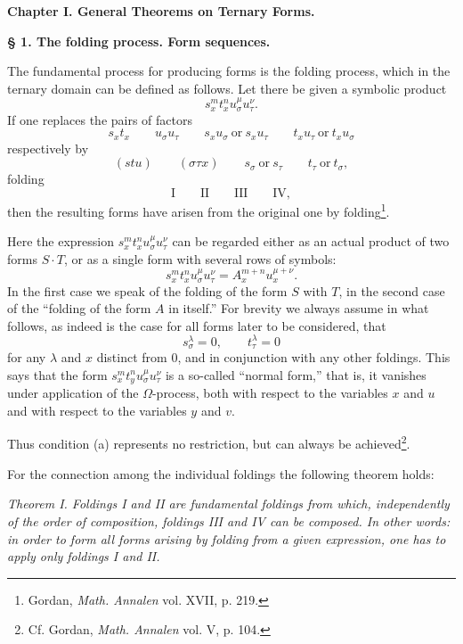 \documentclass[11pt]{article}
\begin{document}
\begin{center}
{\Large\bfseries Chapter I. \quad General Theorems on Ternary Forms.}
\end{center}

\begin{center}
\textbf{§ 1. \quad The folding process. \quad Form sequences.}
\end{center}

The fundamental process for producing forms is the folding process, which in the ternary domain can be defined as follows. Let there be given a symbolic product
\[
s_x^m t_x^n u_\sigma^\mu u_\tau^\nu .
\]
If one replaces the pairs of factors
\[
s_xt_x\qquad u_\sigma u_\tau\qquad s_xu_\sigma\ \text{or}\ s_xu_\tau
\qquad t_xu_\tau\ \text{or}\ t_xu_\sigma
\]
respectively by
\[
(stu)\qquad (\sigma\tau x)\qquad s_\sigma\ \text{or}\ s_\tau
\qquad t_\tau\ \text{or}\ t_\sigma,
\]
folding
\[
\text{I}\qquad\text{II}\qquad\text{III}\qquad\text{IV},
\]
then the resulting forms have arisen from the original one by folding\footnote{Gordan, \emph{Math. Annalen} vol. XVII, p. 219.}.

Here the expression $s_x^m t_x^n u_\sigma^\mu u_\tau^\nu$ can be regarded either as an actual product of two forms $S\cdot T$, or as a single form with several rows of symbols:
\[
s_x^m t_x^n u_\sigma^\mu u_\tau^\nu=A_x^{m+n}u_x^{\mu+\nu}.
\]
In the first case we speak of the folding of the form $S$ with $T$, in the second case of the ``folding of the form $A$ in itself.'' For brevity we always assume in what follows, as indeed is the case for all forms later to be considered, that
\[
\tag{a}
s_\sigma^\lambda=0,\qquad t_\tau^\lambda=0
\]
for any $\lambda$ and $x$ distinct from 0, and in conjunction with any other foldings. This says that the form $s_x^m t_y^n u_\sigma^\mu u_\tau^\nu$ is a so-called ``normal form,'' that is, it vanishes under application of the $\Omega$-process, both with respect to the variables $x$ and $u$ and with respect to the variables $y$ and $v$.

Thus condition (a) represents no restriction, but can always be achieved\footnote{Cf. Gordan, \emph{Math. Annalen} vol. V, p. 104.}.

For the connection among the individual foldings the following theorem holds:

\emph{Theorem I. Foldings I and II are fundamental foldings from which, independently of the order of composition, foldings III and IV can be composed. In other words: in order to form all forms arising by folding from a given expression, one has to apply only foldings I and II.}
\end{document}

